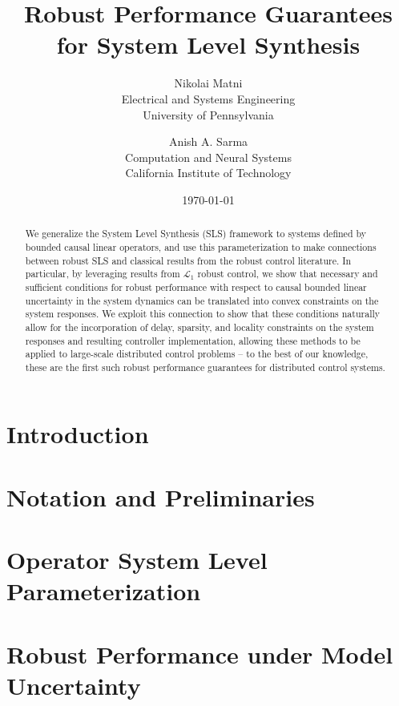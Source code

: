 \documentclass[11pt]{article}
\title{Robust Performance Guarantees for System Level Synthesis}
\author{Nikolai Matni \vspace{0.0625in}
\\
Electrical and Systems Engineering \\
University of Pennsylvania  \and Anish A. Sarma\vspace{0.0625in}
\\
Computation and Neural Systems \\
California Institute of Technology 
}
\date{\today}
\numberwithin{theorem}{section}
\numberwithin{equation}{section}
\begin{document}
\maketitle
\begin{abstract}
We generalize the System Level Synthesis (SLS) framework to systems defined by bounded causal linear operators, and use this parameterization to make connections between robust SLS and classical results from the robust control literature.  In particular, by leveraging results from $\mathcal{L}_1$ robust control, we show that necessary and sufficient conditions for robust performance with respect to causal bounded linear uncertainty in the system dynamics can be translated into convex constraints on the system responses.  We exploit this connection to show that these conditions naturally allow for the incorporation of delay, sparsity, and locality constraints on the system responses and resulting controller implementation, allowing these methods to be applied to large-scale distributed control problems -- to the best of our knowledge, these are the first such robust performance guarantees for distributed control systems.  %
\end{abstract}

\section{Introduction}
\label{sec:introduction}


\section{Notation and Preliminaries}
\label{sec:notation}


\section{Operator System Level Parameterization}
\label{sec:operator}


\section{Robust Performance under Model Uncertainty}
\label{sec:robust-perf}

\end{document}
